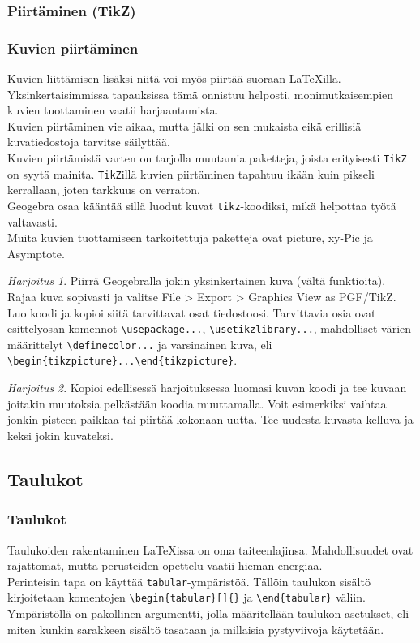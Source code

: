 \documentclass[handout,hyperref={colorlinks=true}]{beamer}
\theoremstyle{remark}
\newtheorem{harj}{Harjoitus}[section]
\newcommand{\vaihto}{\\ \vspace{10pt}}
\begin{document}
\subsubsection{Piirtäminen (TikZ)}
\begin{frame}[fragile]
    \frametitle{Kuvien piirtäminen}
    Kuvien liittämisen lisäksi niitä voi myös piirtää suoraan \LaTeX illa. Yksinkertaisimmissa tapauksissa tämä onnistuu helposti, monimutkaisempien kuvien tuottaminen vaatii harjaantumista.
    \vaihto
    Kuvien piirtäminen vie aikaa, mutta jälki on sen mukaista eikä erillisiä kuvatiedostoja tarvitse säilyttää.
    \vaihto Kuvien piirtämistä varten on tarjolla muutamia paketteja, joista erityisesti \verb-TikZ- on syytä mainita. 
    \verb-TikZ-illä kuvien piirtäminen tapahtuu ikään kuin pikseli kerrallaan, joten tarkkuus on verraton. 
    \vaihto Geogebra osaa kääntää sillä luodut kuvat \verb-tikz--koodiksi, mikä helpottaa työtä valtavasti.
    \vaihto Muita kuvien tuottamiseen tarkoitettuja paketteja ovat picture, xy-Pic ja Asymptote.
\end{frame}
\begin{frame}[fragile]
    \begin{harj}
    Piirrä Geogebralla jokin yksinkertainen kuva (vältä funktioita). Rajaa kuva sopivasti ja valitse File > Export > Graphics View as PGF/TikZ. Luo koodi ja kopioi siitä tarvittavat osat tiedostoosi. Tarvittavia osia ovat esittelyosan komennot \verb-\usepackage...-, \verb-\usetikzlibrary...-, mahdolliset värien määrittelyt \verb-\definecolor...- ja varsinainen kuva, eli \verb-\begin{tikzpicture}...\end{tikzpicture}-. 
    \end{harj}
    \begin{harj}\label{kelluvaTikz}
        Kopioi edellisessä harjoituksessa luomasi kuvan koodi ja tee kuvaan joitakin muutoksia pelkästään koodia muuttamalla. Voit esimerkiksi vaihtaa jonkin pisteen paikkaa tai piirtää kokonaan uutta. Tee uudesta kuvasta kelluva ja keksi jokin kuvateksi. 
    \end{harj}

\end{frame}
\subsection{Taulukot}
\begin{frame}[fragile]
    \frametitle{Taulukot}
    Taulukoiden rakentaminen \LaTeX issa on oma taiteenlajinsa. Mahdollisuudet ovat rajattomat, mutta perusteiden opettelu vaatii hieman energiaa. 
    \vaihto
Perinteisin tapa on käyttää \verb-tabular--ympäristöä. Tällöin taulukon sisältö kirjoitetaan komentojen \verb-\begin{tabular}[]{}- ja \verb-\end{tabular}- väliin.
    \vaihto
    Ympäristöllä on pakollinen argumentti, jolla määritellään taulukon asetukset, eli miten kunkin sarakkeen sisältö tasataan ja millaisia pystyviivoja käytetään.
\end{frame}
\end{document}
